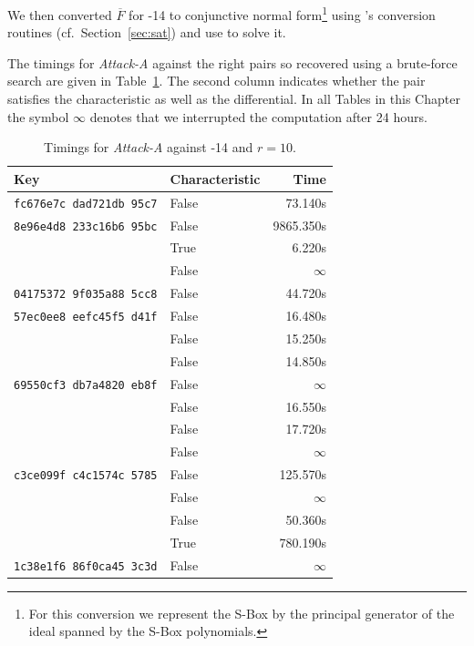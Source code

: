 We then converted $\overline{F}$ for -14 to conjunctive normal form\footnote{For this conversion we represent the S-Box by the principal generator of the ideal spanned by the S-Box polynomials.} using \PolyBoRi's conversion routines (cf.\ Section~\ref{sec:sat}) and use \CryptoMiniSat \cite{SNC09} to solve it.

The timings for \emph{Attack-A} against the right pairs so recovered using a brute-force search are given in Table~\ref{tab:present-attack-a}. The second column indicates whether the pair satisfies the characteristic as well as the differential. In all Tables in this Chapter the symbol $\infty$ denotes that we interrupted the computation after 24 hours.

\begin{table}[ht]
\begin{center}
\begin{tabular}{|l|l|r|}
\hline
Key & Characteristic & Time\\
\hline
\texttt{fc676e7c dad721db 95c7} & False & 73.140s\\
\hline
\texttt{8e96e4d8 233c16b6 95bc} & False & 9865.350s\\
                                & True  & 6.220s\\
                                & False & $\infty$\\
\hline
\texttt{04175372 9f035a88 5cc8} & False & 44.720s\\
\hline
\texttt{57ec0ee8 eefc45f5 d41f} & False & 16.480s\\
                                & False & 15.250s\\
                                & False & 14.850s\\
\hline
\texttt{69550cf3 db7a4820 eb8f} & False & $\infty$\\
                                & False & 16.550s\\
                                & False & 17.720s\\
                                & False & $\infty$\\
\hline
\texttt{c3ce099f c4c1574c 5785} & False & 125.570s\\
                                & False & $\infty$\\
                                & False & 50.360s\\
                                & True  & 780.190s\\
\hline
\texttt{1c38e1f6 86f0ca45 3c3d} & False & $\infty$\\
\hline
\end{tabular}
\end{center}
\caption{Timings for \emph{Attack-A} against -14 and $r=10$.}
\label{tab:present-attack-a}
\end{table}

